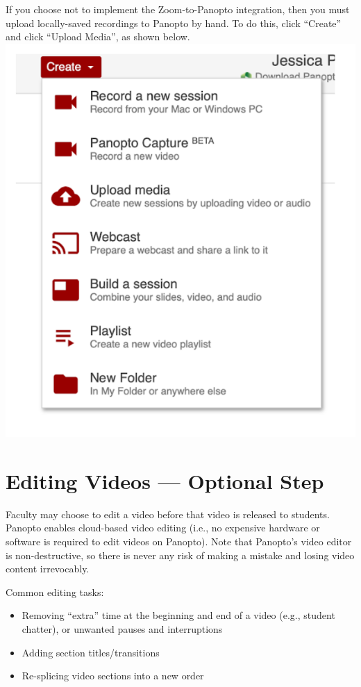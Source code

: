 If you choose not to implement the Zoom-to-Panopto integration, then you must upload locally-saved recordings to Panopto by hand. To do this, click ``Create'' and click ``Upload Media'', as shown below.
{
	\centering
	\includegraphics[scale=0.4]{panopto/media/07-create.png}
}


\section{Editing Videos --- Optional Step}
\label{sec:panopto:editing_videos}

Faculty may choose to edit a video before that video is released to students. Panopto enables cloud-based video editing (i.e., no expensive hardware or software is required to edit videos on Panopto). Note that Panopto’s video editor is non-destructive, so there is never any risk of making a mistake and losing video content irrevocably.

Common editing tasks:
\begin{itemize}
	\item Removing ``extra'' time at the beginning and end of a video (e.g., student chatter), or unwanted pauses and interruptions
	\item Adding section titles/transitions
	\item Re-splicing video sections into a new order
\end{itemize}


